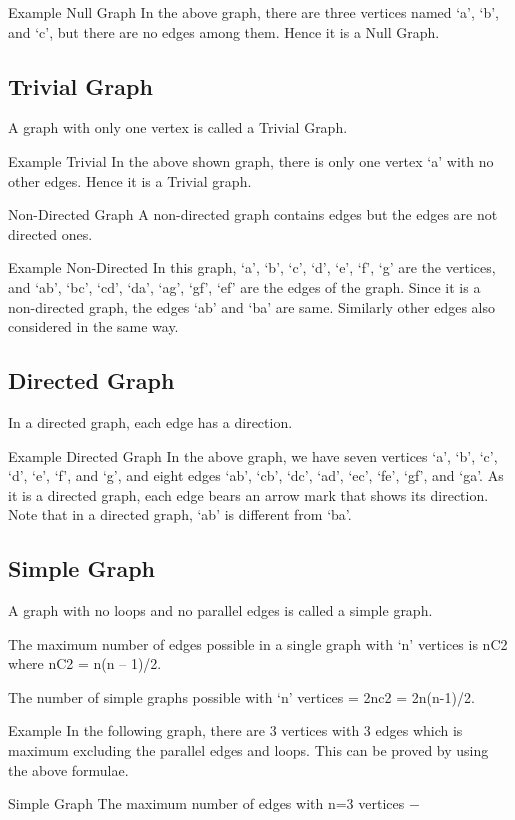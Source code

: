 Example
Null Graph
In the above graph, there are three vertices named ‘a’, ‘b’, and ‘c’, but there are no edges among them. Hence it is a Null Graph.

\subsection{Trivial Graph}
A graph with only one vertex is called a Trivial Graph.

Example
Trivial
In the above shown graph, there is only one vertex ‘a’ with no other edges. Hence it is a Trivial graph.

Non-Directed Graph
A non-directed graph contains edges but the edges are not directed ones.

Example
Non-Directed
In this graph, ‘a’, ‘b’, ‘c’, ‘d’, ‘e’, ‘f’, ‘g’ are the vertices, and ‘ab’, ‘bc’, ‘cd’, ‘da’, ‘ag’, ‘gf’, ‘ef’ are the edges of the graph. Since it is a non-directed graph, the edges ‘ab’ and ‘ba’ are same. Similarly other edges also considered in the same way.

\subsection{Directed Graph}
In a directed graph, each edge has a direction.

Example
Directed Graph
In the above graph, we have seven vertices ‘a’, ‘b’, ‘c’, ‘d’, ‘e’, ‘f’, and ‘g’, and eight edges ‘ab’, ‘cb’, ‘dc’, ‘ad’, ‘ec’, ‘fe’, ‘gf’, and ‘ga’. As it is a directed graph, each edge bears an arrow mark that shows its direction. Note that in a directed graph, ‘ab’ is different from ‘ba’.

\subsection{Simple Graph}
A graph with no loops and no parallel edges is called a simple graph.

The maximum number of edges possible in a single graph with ‘n’ vertices is nC2 where nC2 = n(n – 1)/2.

The number of simple graphs possible with ‘n’ vertices = 2nc2 = 2n(n-1)/2.

Example
In the following graph, there are 3 vertices with 3 edges which is maximum excluding the parallel edges and loops. This can be proved by using the above formulae.

Simple Graph
The maximum number of edges with n=3 vertices −


